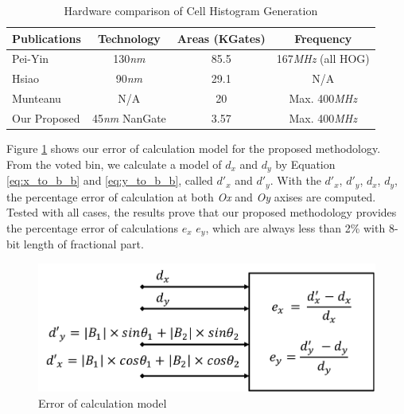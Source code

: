 \begin{table}[h]
\centering
\caption{Hardware comparison of Cell Histogram Generation }
\label{tab:cell_histogram_generation_hardware_comparison}
\begin{tabular}{|l|c|c|c|}
\hline
\textbf{Publications} & \textbf{Technology} & \textbf{Areas (KGates)} & \textbf{Frequency} \\ \hline
Pei-Yin \cite{pei-yinchen2014ehia}          & 130\textit{nm}               & 85.5                    & 167\textit{MHz} (all HOG)   \\ \hline
Hsiao \cite{hsiao2016hdh}                   & 90\textit{nm}                & 29.1                    & N/A                \\ \hline
Munteanu \cite{munteanu2016mph}             & N/A                 & 20                      & Max. 400\textit{MHz}        \\ \hline
Our Proposed                                & 45\textit{nm} NanGate        & 3.57                    & Max. 400\textit{MHz}        \\ \hline
\end{tabular}
\end{table}




Figure \ref{fig:verification_model} shows our error of calculation model for the
proposed methodology.
From the voted bin, we calculate a model of $d_x$ and $d_y$ by Equation
\ref{eq:x_to_b_b} and \ref{eq:y_to_b_b}, called $d'_x$ and $d'_y$.
With the $d'_x$, $d'_y$, $d_x$, $d_y$, the percentage error of calculation at
both \textit{Ox} and \textit{Oy} axises are  computed.
Tested with all cases, the results prove that our proposed methodology provides
the  percentage error of calculations $e_x$ $e_y$, which  are always  less than 2\% with 8-bit length of
fractional part.
\begin{figure}[h]
	\centering
	\def\sscale{0.8\linewidth}
	\includegraphics[width=\sscale]{"imgs/verification_model"}
	\caption{Error of calculation model}
	\label{fig:verification_model}
\end{figure}



